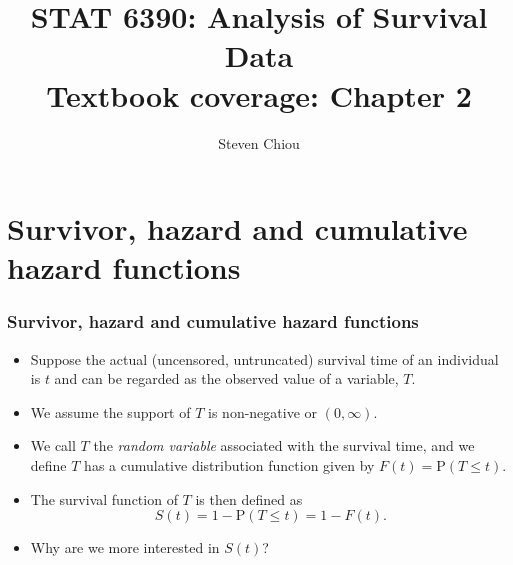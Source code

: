 \documentclass[10pt]{beamer}\usepackage[]{graphicx}\usepackage[]{color}
\title[STAT 6390]{STAT 6390: Analysis of Survival Data\\
  \small{Textbook coverage: Chapter 2}\\}
\author[Steven Chiou]{Steven Chiou}
\institute[UTD]{Department of Mathematical Sciences, \\ University of Texas at Dallas}
\date{}
\newcommand{\p}{\mathrm{P}}
\begin{document}
\begin{frame}[fragile]
  \titlepage

\end{frame}

\bgroup
{}

\section{Survivor, hazard and cumulative hazard functions}
\begin{frame}[fragile]
  \frametitle{Survivor, hazard and cumulative hazard functions}
  \begin{itemize}
  \item Suppose the actual (uncensored, untruncated) survival time of an individual is $t$
    and can be regarded as the observed value of a variable, $T$.
  \item We assume the support of $T$ is non-negative or $(0, \infty)$.
  \item We call $T$ the \emph{random variable} associated with the survival time, 
    and we define $T$ has a cumulative distribution function given by
    $F(t) = \p(T \le t)$.
  \item The survival function of $T$ is then defined as $$S(t) = 1 - \p(T\le t) = 1 - F(t).$$
  \item Why are we more interested in $S(t)$?
  \end{itemize}


\end{frame}
\end{document}
